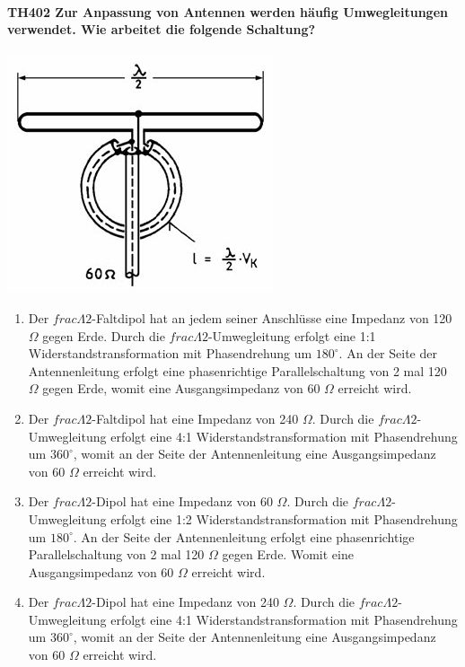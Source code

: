 \documentclass[8pt]{article}
\begin{document}
\paragraph*{TH402 Zur Anpassung von Antennen werden häufig Umwegleitungen verwendet. Wie arbeitet die folgende Schaltung?} 
\begin{center}
	\begin{minipage}{\linewidth}
		\centering
		\includegraphics[scale=1.0]{pics/th402_a.jpg}
	\end{minipage}
\end{center}
\begin{enumerate}[nolistsep,label=\Alph*]
\item Der $frac{\Lambda}{2}$-Faltdipol hat an jedem seiner Anschlüsse eine Impedanz von 120 $\Omega$ gegen Erde. Durch die $frac{\Lambda}{2}$-Umwegleitung erfolgt eine 1:1 Widerstandstransformation mit Phasendrehung um $180^{\circ}$. An der Seite der Antennenleitung erfolgt eine phasenrichtige Parallelschaltung von 2 mal 120 $\Omega$ gegen Erde, womit eine Ausgangsimpedanz von 60 $\Omega$ erreicht wird.
\item Der $frac{\Lambda}{2}$-Faltdipol hat eine Impedanz von 240 $\Omega$. Durch die $frac{\Lambda}{2}$-Umwegleitung erfolgt eine 4:1 Widerstandstransformation mit Phasendrehung um $360^{\circ}$, womit an der Seite der Antennenleitung eine Ausgangsimpedanz von 60 $\Omega$ erreicht wird.
\item Der $frac{\Lambda}{2}$-Dipol hat eine Impedanz von 60 $\Omega$. Durch die $frac{\Lambda}{2}$-Umwegleitung erfolgt eine 1:2 Widerstandstransformation mit Phasendrehung um $180^{\circ}$. An der Seite der Antennenleitung erfolgt eine phasenrichtige Parallelschaltung von 2 mal 120 $\Omega$ gegen Erde. Womit eine Ausgangsimpedanz von 60 $\Omega$ erreicht wird.
\item Der $frac{\Lambda}{2}$-Dipol hat eine Impedanz von 240 $\Omega$. Durch die $frac{\Lambda}{2}$-Umwegleitung erfolgt eine 4:1 Widerstandstransformation mit Phasendrehung um $360^{\circ}$, womit an der Seite der Antennenleitung eine Ausgangsimpedanz von 60 $\Omega$ erreicht wird.
\end{enumerate}
\end{document}
